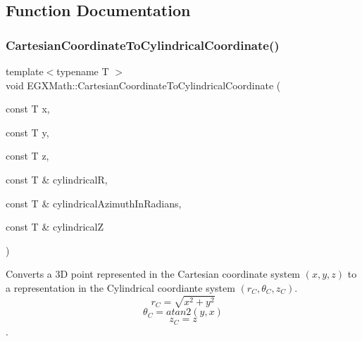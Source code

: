 \subsection{Function Documentation}
\mbox{\label{group___e_g_x_math-_conversions-_coordinate_conversions-3_d-_cartesian_ga256f37d22da9bb58db556ee40dac8d81}} 
\subsubsection{\texorpdfstring{Cartesian\+Coordinate\+To\+Cylindrical\+Coordinate()}{CartesianCoordinateToCylindricalCoordinate()}}
{\footnotesize\ttfamily template$<$typename T $>$ \\
void E\+G\+X\+Math\+::\+Cartesian\+Coordinate\+To\+Cylindrical\+Coordinate (\begin{DoxyParamCaption}\item[{const T}]{x,  }\item[{const T}]{y,  }\item[{const T}]{z,  }\item[{const T \&}]{cylindricalR,  }\item[{const T \&}]{cylindrical\+Azimuth\+In\+Radians,  }\item[{const T \&}]{cylindricalZ }\end{DoxyParamCaption})}



Converts a 3D point represented in the Cartesian coordinate system $(x,y,z)$ to a representation in the Cylindrical coordiante system $(r_C,\theta_C,z_C)$. \[ r_C = \sqrt{x^2+y^2} \] \[ \theta_C = atan2(y,x) \] \[ z_C = z \]. 

